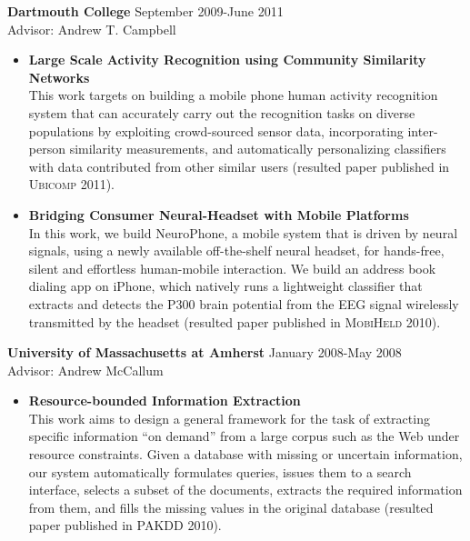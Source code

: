 {\bf Dartmouth College} \hfill September 2009-June 2011\\
Advisor: Andrew T. Campbell
\begin{itemize}
\item \textbf{Large Scale Activity Recognition using Community
  Similarity Networks} \\ This work targets on building a mobile phone
  human activity recognition system that can accurately carry out the
  recognition tasks on diverse populations by exploiting crowd-sourced
  sensor data, incorporating inter-person similarity measurements, and
  automatically personalizing classifiers with data contributed from
  other similar users (resulted paper published in \textsc{Ubicomp 2011}).

\item \textbf{Bridging Consumer Neural-Headset with Mobile Platforms}
  \\ In this work, we build NeuroPhone, a mobile system that is driven
  by neural signals, using a newly available off-the-shelf neural
  headset, for hands-free, silent and effortless human-mobile
  interaction. We build an address book dialing app on iPhone, which
  natively runs a lightweight classifier that extracts and detects the
  P300 brain potential from the EEG signal wirelessly transmitted by
  the headset (resulted paper published in \textsc{MobiHeld 2010}).
\end{itemize}

{\bf University of Massachusetts at Amherst} \hfill January 2008-May
2008 \\ Advisor: Andrew McCallum

\begin{itemize}
\item \textbf{Resource-bounded Information Extraction} \\ This work
  aims to design a general framework for the task of extracting
  specific information ``on demand'' from a large corpus such as the
  Web under resource constraints. Given a database with missing or
  uncertain information, our system automatically formulates queries,
  issues them to a search interface, selects a subset of the
  documents, extracts the required information from them, and fills
  the missing values in the original database (resulted paper
  published in \textsc{PAKDD 2010}).
\end{itemize}
